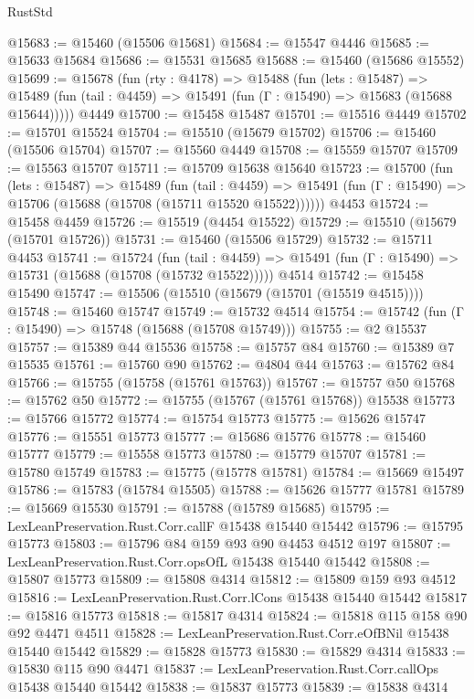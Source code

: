 \begin{lexlean}{RustStd}
\begin{coremodule}
@15683 := @15460 (@15506 @15681)
@15684 := @15547 @4446
@15685 := @15633 @15684
@15686 := @15531 @15685
@15688 := @15460 (@15686 @15552)
@15699 := @15678
    (fun (rty : @4178) =>
    @15488
      (fun (lets : @15487) =>
      @15489 (fun (tail : @4459) => @15491 (fun (Γ : @15490) => @15683 (@15688 @15644)))))
    @4449
@15700 := @15458 @15487
@15701 := @15516 @4449
@15702 := @15701 @15524
@15704 := @15510 (@15679 @15702)
@15706 := @15460 (@15506 @15704)
@15707 := @15560 @4449
@15708 := @15559 @15707
@15709 := @15563 @15707
@15711 := @15709 @15638 @15640
@15723 := @15700
    (fun (lets : @15487) =>
    @15489
      (fun (tail : @4459) =>
      @15491 (fun (Γ : @15490) => @15706 (@15688 (@15708 (@15711 @15520 @15522))))))
    @4453
@15724 := @15458 @4459
@15726 := @15519 (@4454 @15522)
@15729 := @15510 (@15679 (@15701 @15726))
@15731 := @15460 (@15506 @15729)
@15732 := @15711 @4453
@15741 := @15724
    (fun (tail : @4459) => @15491 (fun (Γ : @15490) => @15731 (@15688 (@15708 (@15732 @15522)))))
    @4514
@15742 := @15458 @15490
@15747 := @15506 (@15510 (@15679 (@15701 (@15519 @4515))))
@15748 := @15460 @15747
@15749 := @15732 @4514
@15754 := @15742 (fun (Γ : @15490) => @15748 (@15688 (@15708 @15749)))
@15755 := @2 @15537
@15757 := @15389 @44 @15536
@15758 := @15757 @84
@15760 := @15389 @7 @15535
@15761 := @15760 @90
@15762 := @4804 @44
@15763 := @15762 @84
@15766 := @15755 (@15758 (@15761 @15763))
@15767 := @15757 @50
@15768 := @15762 @50
@15772 := @15755 (@15767 (@15761 @15768)) @15538
@15773 := @15766 @15772
@15774 := @15754 @15773
@15775 := @15626 @15747
@15776 := @15551 @15773
@15777 := @15686 @15776
@15778 := @15460 @15777
@15779 := @15558 @15773
@15780 := @15779 @15707
@15781 := @15780 @15749
@15783 := @15775 (@15778 @15781)
@15784 := @15669 @15497
@15786 := @15783 (@15784 @15505)
@15788 := @15626 @15777 @15781
@15789 := @15669 @15530
@15791 := @15788 (@15789 @15685)
@15795 := LexLeanPreservation.Rust.Corr.callF @15438 @15440 @15442
@15796 := @15795 @15773
@15803 := @15796 @84 @159 @93 @90 @4453 @4512 @197
@15807 := LexLeanPreservation.Rust.Corr.opsOfL @15438 @15440 @15442
@15808 := @15807 @15773
@15809 := @15808 @4314
@15812 := @15809 @159 @93 @4512
@15816 := LexLeanPreservation.Rust.Corr.lCons @15438 @15440 @15442
@15817 := @15816 @15773
@15818 := @15817 @4314
@15824 := @15818 @115 @158 @90 @92 @4471 @4511
@15828 := LexLeanPreservation.Rust.Corr.eOfBNil @15438 @15440 @15442
@15829 := @15828 @15773
@15830 := @15829 @4314
@15833 := @15830 @115 @90 @4471
@15837 := LexLeanPreservation.Rust.Corr.callOps @15438 @15440 @15442
@15838 := @15837 @15773
@15839 := @15838 @4314

\end{coremodule}
\end{lexlean}

